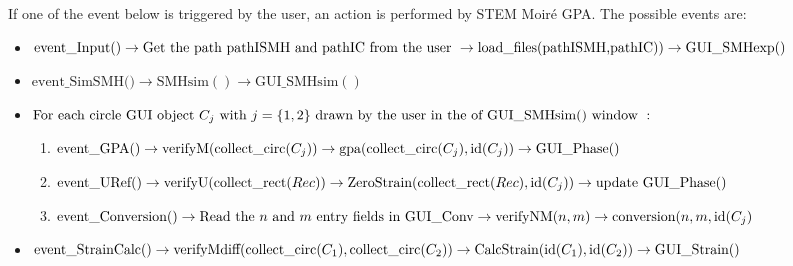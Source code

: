 \documentclass[12pt, titlepage]{article}
\newcommand{\progname}{STEM Moir{\'e} GPA}
\begin{document}
\begin{itemize}
If one of the event below is triggered by the user, an action is performed by 
\progname{}. The possible events are:
	\begin{itemize}
	\item $\text{event{\_}Input()} \\ \rightarrow \text{Get the path pathISMH and 
pathIC from the user} \  \rightarrow \\ 
\text{load{\_}files(pathISMH,pathIC)})\rightarrow \text{GUI{\_}SMHexp}()$
	\item $\text{event{\_}SimSMH()} \rightarrow \text{SMHsim}() \rightarrow 
\text{GUI{\_}SMHsim}()$
	\item $\text{For each circle GUI object } C_j \text{ with } j=\{1,2\} \\ \text{ 
drawn by the user in the of GUI{\_}SMHsim() window }: $
		\begin{enumerate}
		\item $\text{event{\_}GPA()} \rightarrow 
\text{verifyM}(\text{collect{\_}circ}(C_j)) \rightarrow \\ 
\text{gpa}(\text{collect{\_}circ}(C_j),\text{id}(C_j)) \rightarrow 
\text{GUI{\_}Phase}()$
		\item $\text{event{\_}URef()} \rightarrow 
\text{verifyU}(\text{collect{\_}rect}(Rec))\rightarrow \\ \text{ZeroStrain}( 
\text{collect{\_}rect}(Rec),\text{id}(C_j))\rightarrow \text{update 
GUI{\_}Phase}()$
		\item $\text{event{\_}Conversion()} \rightarrow \text{Read the $n$ and $m$ 
entry fields in GUI{\_}Conv} \rightarrow \\ \text{verifyNM}(n,m)\rightarrow 
\text{conversion}(n,m,\text{id}(C_j)$
		\end{enumerate}
	\item $\text{event{\_}StrainCalc()} \rightarrow 
\text{verifyMdiff}(\text{collect{\_}circ}(C_1),\text{collect{\_}circ}(C_2)) 
\rightarrow \\
	 \text{CalcStrain}(\text{id}(C_1),\text{id}(C_2))\rightarrow 
\text{GUI{\_}Strain}()$
	\end{itemize}
\end{itemize}

\end{document}
